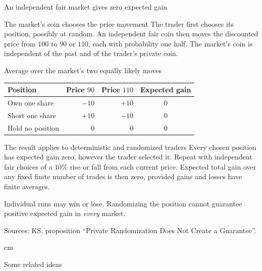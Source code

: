 \documentclass{beamer}
\newcommand{\sourcefoot}[1]{%
  \par\vfill{\fontsize{6.3}{7.5}\selectfont\color{black!65}Sources: #1\par}}
\begin{document}
\begin{frame}[shrink=8]{An independent fair market gives zero expected gain}
\small
\begin{block}{The market's coin chooses the price movement}
The trader first chooses its position, possibly at random.
An independent fair coin then moves the discounted price from $100$
to $90$ or $110$, each with probability one half.
The market's coin is independent of the past and of the trader's private coin.
\end{block}

\begin{exampleblock}{Average over the market's two equally likely moves}
\centering
\renewcommand{\arraystretch}{1.3}
\setlength{\tabcolsep}{8pt}
\begin{tabular}{@{}lrrc@{}}
Position & Price $90$ & Price $110$ & Expected gain\\\hline
\rowcolor{black!15}
Own one share & $-10$ & $+10$ & $0$\\
Short one share & $+10$ & $-10$ & $0$\\
\rowcolor{black!15}
Hold no position & $0$ & $0$ & $0$
\end{tabular}
\end{exampleblock}

\begin{alertblock}{The result applies to deterministic and randomized traders}
Every chosen position has expected gain zero, however the trader selected it.
Repeat with independent fair choices of a $10\%$ rise or fall from each
current price. Expected total gain over any fixed finite number of trades
is then zero, provided gains and losses have finite averages.
\par\smallskip
Individual runs may win or lose. Randomizing the position cannot guarantee
positive expected gain in \emph{every} market.
\end{alertblock}
\sourcefoot{KS, proposition \enquote{Private Randomization Does Not Create a Guarantee}.}
\end{frame}

\begin{frame}
 cm
\begin{center}
\Large\color{blue}Some related ideas
\end{center}
\end{frame}
\end{document}
